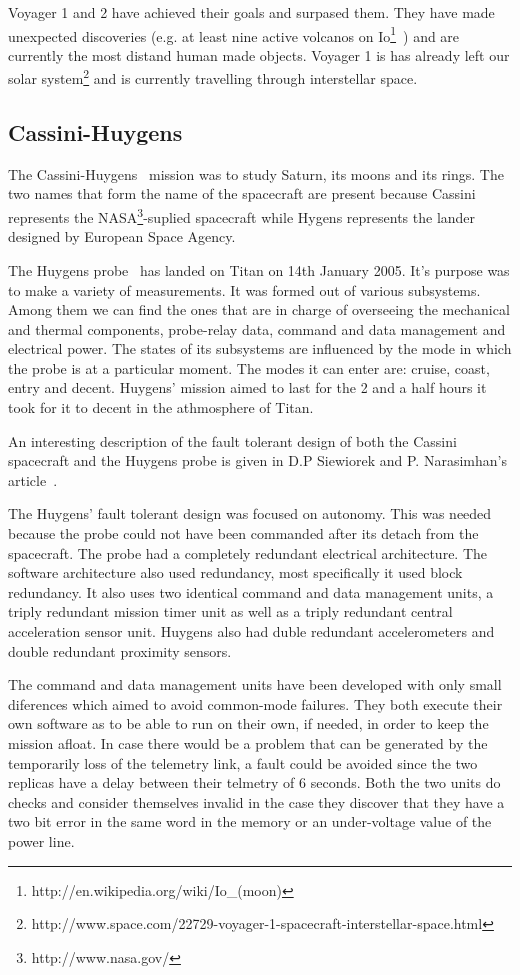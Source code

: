Voyager 1 and 2 have achieved their goals and surpased them. They have made
unexpected discoveries (e.g. at least nine active volcanos on
Io\footnote{http://en.wikipedia.org/wiki/Io\_(moon)}~\cite{tvs}) and are
currently the most distand human made objects. Voyager 1 is has already left our
solar
system\footnote{http://www.space.com/22729-voyager-1-spacecraft-interstellar-space.html}
and is currently travelling through interstellar space.

\subsection{Cassini-Huygens}

The Cassini-Huygens~\cite{ch-nasa} mission was to study Saturn, its moons and
its rings. The two names that form the name of the spacecraft are present because
Cassini represents the NASA\footnote{http://www.nasa.gov/}-suplied spacecraft
while Hygens represents the lander designed by European Space Agency.

The Huygens probe~\cite{hygens} has landed on Titan on 14th January 2005. It's
purpose was to make a variety of measurements. It was formed out of various
subsystems. Among them we can find the ones that are in charge of overseeing the
mechanical and thermal components, probe-relay data, command and data management
and electrical power. The states of its subsystems are influenced by the mode in
which the probe is at a particular moment. The modes it can enter are: cruise,
coast, entry and decent. Huygens' mission aimed to last for the 2 and a half
hours it took for it to decent in the athmosphere of Titan.

An interesting description of the fault tolerant design of both the Cassini
spacecraft and the Huygens probe is given in D.P Siewiorek and P.
Narasimhan's article~\cite{ft-space-avionics}. 

The Huygens' fault tolerant design was focused on autonomy. This was needed
because the probe could not have been commanded after its detach from the
spacecraft. The probe had a completely redundant electrical architecture. The
software architecture also used redundancy, most specifically it used block
redundancy. It also uses two identical command and data management units, a
triply redundant mission timer unit as well as a triply redundant central
acceleration sensor unit. Huygens also had duble redundant accelerometers and
double redundant proximity sensors.

The command and data management units have been developed with only small
diferences which aimed to avoid common-mode failures. They both execute their
own software as to be able to run on their own, if needed, in order to keep the
mission afloat. In case there would be a problem that can be generated by the
temporarily loss of the telemetry link, a fault could be avoided since the two
replicas have a delay between their telmetry of 6 seconds. Both the two units do
checks and consider themselves invalid in the case they discover that they have
a two bit error in the same word in the memory or an under-voltage value of the
power line.

